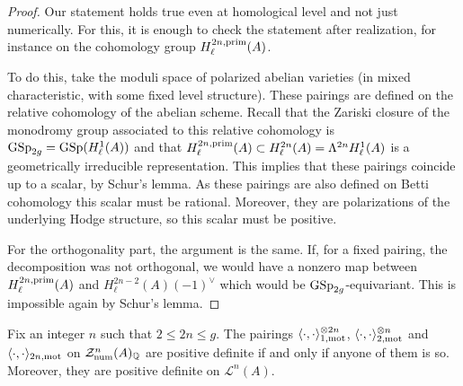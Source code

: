 \documentclass[11pt]{amsart}
\begin{document}
\begin{proof}
 Our statement holds true even at homological level and not just numerically. For this, it is enough to check the statement after realization, for instance on the cohomology group $H_\ell^{2n,\mathrm{prim}}(A)$. 

To do this, take the moduli space of polarized abelian varieties (in mixed characteristic, with some fixed level structure). These pairings are defined on  the relative cohomology of the abelian scheme. Recall that the Zariski closure of the monodromy group associated to this relative cohomology is $\textnormal{GSp}_{2g}= \textnormal{GSp}(H_\ell^{1}(A))$ and that $H_\ell^{2n,\mathrm{prim}}(A)\subset  H_\ell^{2n }(A) = \Lambda^{2n}H_\ell^{1}(A)$  is a geometrically irreducible representation. This implies that these pairings coincide up to a scalar, by Schur's lemma. As these pairings are also defined on Betti cohomology this scalar must be rational. Moreover, they are polarizations of the underlying Hodge structure, so this scalar must be positive.

For the orthogonality part, the argument is the same. If, for a fixed pairing, the decomposition was not orthogonal, we would have a nonzero map between $H_\ell^{2n,\mathrm{prim}}(A)$ and $H_\ell^{2n-2}(A)(-1)^\vee$ which would be $\textnormal{GSp}_{2g}$-equivariant. This is impossible again by Schur's lemma.
 \end{proof}
\begin{proposition}\label{oklefschetz}
Fix an integer $n$ such that   $ 2 \leq 2n\leq g.$ The pairings $\langle \cdot, \cdot \rangle_{1,\mathrm{mot} }^{\otimes 2n}$,  $\langle \cdot, \cdot \rangle_{2,\mathrm{mot}}^{\otimes n}$ and $\langle \cdot, \cdot \rangle_{2n,\mathrm{mot}} $  on  $\mathcal{Z}^{n}_{\mathrm{num}}(A)_{\mathbb{Q}}$ are positive definite if and only if anyone of them is so. Moreover, they are positive definite on $\mathcal{L}^{n}(A)$.\end{proposition}
\end{document}

